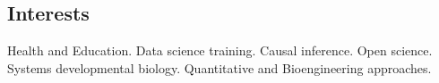 \documentclass[margin,line]{res}
\begin{document}
\begin{resume}

\vspace*{.15in}

\section{\sc Interests}%

Health and Education. Data science training. Causal inference. Open science. \\
Systems developmental biology. Quantitative and Bioengineering approaches.






\end{resume}
\end{document}
